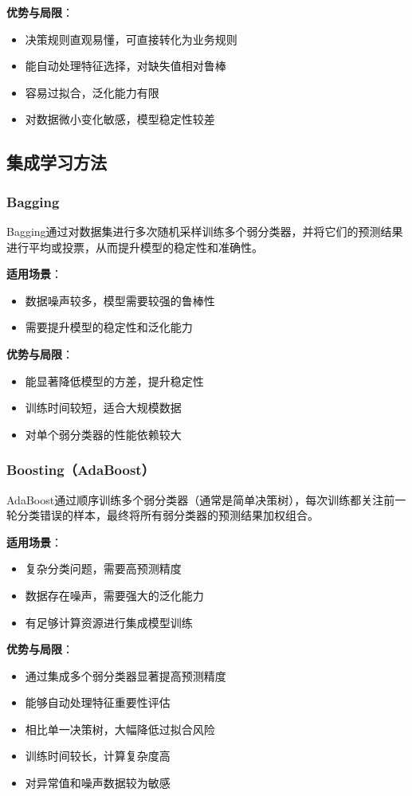 \documentclass{article}
\begin{document}
\textbf{优势与局限}：
\begin{itemize}
    \item 决策规则直观易懂，可直接转化为业务规则
    \item 能自动处理特征选择，对缺失值相对鲁棒
    \item 容易过拟合，泛化能力有限
    \item 对数据微小变化敏感，模型稳定性较差
\end{itemize}

\subsection{集成学习方法}
\subsubsection{Bagging}
Bagging通过对数据集进行多次随机采样训练多个弱分类器，并将它们的预测结果进行平均或投票，从而提升模型的稳定性和准确性。

\textbf{适用场景}：
\begin{itemize}
    \item 数据噪声较多，模型需要较强的鲁棒性
    \item 需要提升模型的稳定性和泛化能力
\end{itemize}

\textbf{优势与局限}：
\begin{itemize}
    \item 能显著降低模型的方差，提升稳定性
    \item 训练时间较短，适合大规模数据
    \item 对单个弱分类器的性能依赖较大
\end{itemize}

\subsubsection{Boosting（AdaBoost）}
AdaBoost通过顺序训练多个弱分类器（通常是简单决策树），每次训练都关注前一轮分类错误的样本，最终将所有弱分类器的预测结果加权组合。

\textbf{适用场景}：
\begin{itemize}
    \item 复杂分类问题，需要高预测精度
    \item 数据存在噪声，需要强大的泛化能力
    \item 有足够计算资源进行集成模型训练
\end{itemize}

\textbf{优势与局限}：
\begin{itemize}
    \item 通过集成多个弱分类器显著提高预测精度
    \item 能够自动处理特征重要性评估
    \item 相比单一决策树，大幅降低过拟合风险
    \item 训练时间较长，计算复杂度高
    \item 对异常值和噪声数据较为敏感
\end{itemize}
\end{document}
